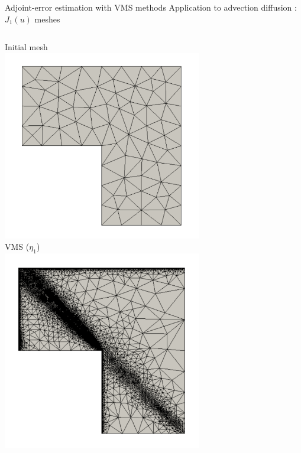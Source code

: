 \documentclass[fleqn]{beamer}
\begin{document}
\begin{frame}{Adjoint-error estimation with VMS methods}
{Application to advection diffusion : $J_1(u)$ meshes}

\begin{columns}
\begin{column}{0.5\textwidth}
\centering
Initial mesh \\
\includegraphics[width=0.65\textwidth]{../img/vms_lshape_global_initial.pdf} \\
VMS ($\eta_1$) \\
\includegraphics[width=0.65\textwidth]{../img/vms_lshape_global_vms1_final.pdf} 
\end{column}


\end{columns}
\end{frame}
\end{document}

